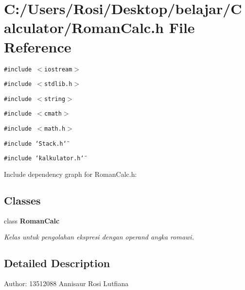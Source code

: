 \section{C:/Users/Rosi/Desktop/belajar/Calculator/Roman\-Calc.h File Reference}
\label{_roman_calc_8h}
{\tt \#include $<$iostream$>$}\par
{\tt \#include $<$stdlib.h$>$}\par
{\tt \#include $<$string$>$}\par
{\tt \#include $<$cmath$>$}\par
{\tt \#include $<$math.h$>$}\par
{\tt \#include \char`\"{}Stack.h\char`\"{}}\par
{\tt \#include \char`\"{}kalkulator.h\char`\"{}}\par


Include dependency graph for Roman\-Calc.h:\subsection*{Classes}
\begin{CompactItemize}
\item 
class {\bf Roman\-Calc}
\begin{CompactList}\small\item\em Kelas untuk pengolahan ekspresi dengan operand angka romawi. \item\end{CompactList}\end{CompactItemize}


\subsection{Detailed Description}
\begin{Desc}
\item[Author:]13512088 Annisaur Rosi Lutfiana \end{Desc}

